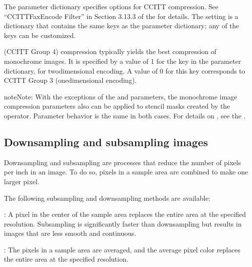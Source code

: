 \documentclass[letterpaper,12pt,english,openany,oneside]{sphinxmanual}
\begin{document}
The  parameter dictionary specifies options for CCITT compression. See “CCITTFaxEncode Filter” in Section 3.13.3 of the  for details. The  setting is a dictionary that contains the same keys as the  parameter dictionary; any of the keys can be customized.

 (CCITT Group 4) compression typically yields the best compression of monochrome images. It is specified by a value of \sphinxhyphen{}1 for the  key in the  parameter dictionary, for two\sphinxhyphen{}dimensional encoding. A value of 0 for this key corresponds to CCITT Group 3 (one\sphinxhyphen{}dimensional encoding).

\begin{sphinxadmonition}{note}{Note:}
With the exceptions of the  and  parameters, the monochrome image compression parameters also can be applied to stencil masks created by the  operator. Parameter behavior is the same in both cases. For details on  , see the  .
\end{sphinxadmonition}




\subsection{Downsampling and subsampling images}
\label{\detokenize{PDF_Create_UsingSettings:downsampling-and-subsampling-images}}
Downsampling and subsampling are processes that reduce the number of pixels per inch in an image. To do so, pixels in a sample area are combined to make one larger pixel.

The following subsampling and downsampling methods are available:

 : A pixel in the center of the sample area replaces the entire area at the specified resolution. Subsampling is significantly faster than downsampling but results in images that are less smooth and continuous.

 : The pixels in a sample area are averaged, and the average pixel color replaces the entire area at the specified resolution.
\end{document}
